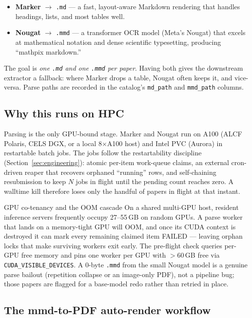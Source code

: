 \documentclass[11pt,letterpaper]{article}
\newcommand{\code}[1]{\texttt{\small #1}}
\begin{document}
\begin{itemize}[noitemsep,topsep=2pt]
\item \textbf{Marker} $\rightarrow$ \code{.md} --- a fast, layout-aware Markdown
  rendering that handles headings, lists, and most tables well.
\item \textbf{Nougat} $\rightarrow$ \code{.mmd} --- a transformer OCR model
  (Meta's Nougat) that excels at mathematical notation and dense scientific
  typesetting, producing ``mathpix markdown.''
\end{itemize}

The goal is \emph{one \code{.md} and one \code{.mmd} per paper}. Having both gives
the downstream extractor a fallback: where Marker drops a table, Nougat often keeps
it, and vice-versa. Parse paths are recorded in the catalog's \code{md\_path} and
\code{mmd\_path} columns.

\subsection{Why this runs on HPC}

Parsing is the only GPU-bound stage. Marker and Nougat run on A100 (ALCF Polaris,
CELS DGX, or a local 8$\times$A100 host) and Intel PVC (Aurora) in restartable batch
jobs. The jobs follow the restartability discipline (Section~\ref{sec:engineering}):
atomic per-item work-queue claims, an external cron-driven reaper that recovers
orphaned ``running'' rows, and self-chaining resubmission to keep $N$ jobs in flight
until the pending count reaches zero. A walltime kill therefore loses only the
handful of papers in flight at that instant.

\begin{notebox}{GPU co-tenancy and the OOM cascade}
On a shared multi-GPU host, resident inference servers frequently occupy 27--55\,GB
on random GPUs. A parse worker that lands on a memory-tight GPU will OOM, and once
its CUDA context is destroyed it can mark every remaining claimed item FAILED ---
leaving orphan locks that make surviving workers exit early. The pre-flight check
queries per-GPU free memory and pins one worker per GPU with ${>}60$\,GB free via
\code{CUDA\_VISIBLE\_DEVICES}. A 0-byte \code{.mmd} from the small Nougat model is a
genuine parse bailout (repetition collapse or an image-only PDF), not a pipeline
bug; those papers are flagged for a base-model redo rather than retried in place.
\end{notebox}

\subsection{The mmd-to-PDF auto-render workflow}
\end{document}
